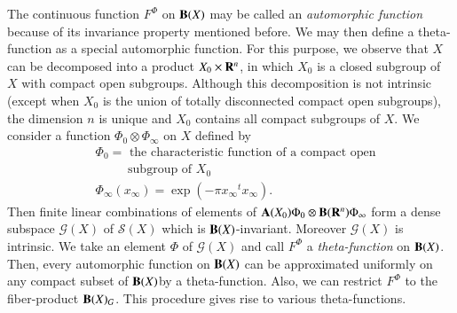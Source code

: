 The continuous function $F^{\Phi}$ on $\mathbf{B}(X)$ may be called an {\em automorphic function} because of its invariance property mentioned before. We may then define a theta-function as a special automorphic function. For this purpose, we observe that $X$ can be decomposed into a product $X_{0}\times \mathbf{R}^{n}$, in which $X_{0}$ is a closed subgroup of $X$ with compact open subgroups. Although this decomposition is not intrinsic (except when $X_{0}$ is the union of totally disconnected compact open subgroups), the dimension $n$ is unique and $X_{0}$ contains all compact subgroups of $X$. We consider a function $\Phi_{0}\otimes \Phi_{\infty}$ on $X$ defined by
\begin{align*}
& \Phi_{0} =  \text{ the characteristic function of a compact open}\\
&\qquad~~\,  \text{subgroup of } X_{0}\\
&\Phi_{\infty}(x_{\infty}) = \exp(-\pi x_{\infty} {}^{t}x_{\infty}).
\end{align*}
Then finite linear combinations of elements of $\mathbf{A}(X_{0})\Phi_{0}\otimes \mathbf{B}(\mathbf{R}^{n})\Phi_{\infty}$ form a dense subspace $\mathscr{G}(X)$ of $\mathscr{S}(X)$ which is $\mathbf{B}(X)$-invariant. Moreover $\mathscr{G}(X)$ is intrinsic. We take an element $\Phi$ of $\mathscr{G}(X)$ and call $F^{\Phi}$ a {\em theta-function} on $\mathbf{B}(X)$. Then, every automorphic function on $\mathbf{B}(X)$ can be approximated uniformly on any compact subset of $\mathbf{B}(X)$\pageoriginale by a theta-function. Also, we can restrict $F^{\Phi}$ to the fiber-product $\mathbf{B}(X)_{G}$. This procedure gives rise to various theta-functions.

